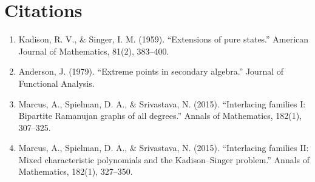 \section{Citations}

\begin{enumerate}
\item Kadison, R. V., \& Singer, I. M. (1959). ``Extensions of pure states.'' American Journal of Mathematics, 81(2), 383--400.
\item Anderson, J. (1979). ``Extreme points in secondary algebra.'' Journal of Functional Analysis.
\item Marcus, A., Spielman, D. A., \& Srivastava, N. (2015). ``Interlacing families I: Bipartite Ramanujan graphs of all degrees.'' Annals of Mathematics, 182(1), 307--325.
\item Marcus, A., Spielman, D. A., \& Srivastava, N. (2015). ``Interlacing families II: Mixed characteristic polynomials and the Kadison--Singer problem.'' Annals of Mathematics, 182(1), 327--350.
\end{enumerate}
